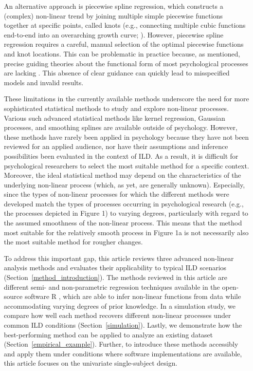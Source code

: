 \documentclass[man, floatsintext]{apa7}
\begin{document}
An alternative approach is piecewise spline regression, which constructs a
(complex) non-linear trend by joining multiple simple piecewise functions
together at specific points, called knots (e.g., connecting multiple cubic
functions end-to-end into an overarching growth curve;
\textcite{tsay_nonlinear_2019}). However, piecewise spline regression requires
a careful, manual selection of the optimal piecewise functions and knot
locations. This can be problematic in practice because, as mentioned, precise
guiding theories about the functional form of most psychological processes are
lacking \parencite{tan_time-varying_2011}. This absence of clear guidance can
quickly lead to misspecified models and invalid results.

These limitations in the currently available methods underscore the need for
more sophisticated statistical methods to study and explore non-linear
processes. Various such advanced statistical methods like kernel regression,
Gaussian processes, and smoothing splines are available outside of psychology.
However, these methods have rarely been applied in psychology because they have
not been reviewed for an applied audience, nor have their assumptions and
inference possibilities been evaluated in the context of ILD\@. As a result, it
is difficult for psychological researchers to select the most suitable method
for a specific context. Moreover, the ideal statistical method may depend on
the characteristics of the underlying non-linear process (which, as yet,  are
generally unknown). Especially, since the types of non-linear processes for
which the different methods were developed match the types of processes
occurring in psychological research (e.g., the processes depicted in Figure 1)
to varying degrees, particularly with regard to the assumed smoothness of the
non-linear process. This means that the method most suitable for the relatively
smooth process in Figure 1a is not necessarily also the most suitable method
for rougher changes.

To address this important gap, this article reviews three advanced non-linear
analysis methods and evaluates their applicability to typical ILD scenarios
(Section~\ref{method_introduction}). The methods reviewed in this article are
different semi- and non-parametric regression techniques available in the
open-source software R \parencite{R-base}, which are able to infer non-linear
functions from data while accommodating varying degrees of prior knowledge. In
a simulation study, we compare how well each method recovers different
non-linear processes under common ILD conditions (Section~\ref{simulation}).
Lastly, we demonstrate how the best-performing method can be applied to analyze
an existing dataset (Section~\ref{empirical_example}). Further, to introduce
these methods accessibly and apply them under conditions where software
implementations are available, this article focuses on the univariate
single-subject design.
\end{document}
